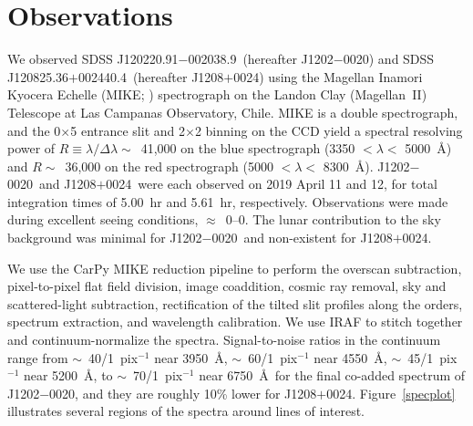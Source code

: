 \documentclass[twocolumn,tighten]{aastex62}
\newcommand{\jtwo}{J1202$-$0020}
\newcommand{\jeight}{J1208$+$0024}
\newcommand{\jtwolong}{SDSS J120220.91$-$002038.9}
\newcommand{\jeightlong}{SDSS J120825.36$+$002440.4}
\begin{document}
\section{Observations}
\label{obs}


We observed  \jtwolong\ (hereafter \jtwo) and
\jeightlong\ (hereafter \jeight)
using the
Magellan Inamori Kyocera Echelle (MIKE; \citealt{bernstein03}) spectrograph
on the Landon Clay (Magellan~II) Telescope at 
Las Campanas Observatory, Chile.
MIKE is a double spectrograph, and
the 0$\times$5 
entrance slit and 2$\times$2 binning on the CCD yield a 
spectral resolving power of 
$R \equiv \lambda/\Delta\lambda \sim$~41,000 on the blue spectrograph
(3350 $< \lambda <$ 5000~\AA) and $R \sim$~36,000 on the red spectrograph
(5000 $< \lambda <$ 8300~\AA).
\jtwo\ and \jeight\ were each observed on 2019 April 11 and 12,
for total integration times of 5.00~hr and 5.61~hr, respectively.
Observations were made during excellent seeing conditions,
$\approx$~0--0.
The lunar contribution to the sky background was minimal for
\jtwo\ and non-existent for \jeight.

We use the CarPy MIKE reduction pipeline
\citep{kelson00,kelson03}
to perform the overscan subtraction, pixel-to-pixel flat field division,
image coaddition, cosmic ray removal, sky and scattered-light subtraction,
rectification of the tilted slit profiles along the orders,
spectrum extraction, and wavelength calibration.
We use IRAF \citep{tody93} to stitch together and
continuum-normalize the spectra.
Signal-to-noise ratios in the continuum range from
$\sim$~40/1~pix$^{-1}$ near 3950~\AA,
$\sim$~60/1~pix$^{-1}$ near 4550~\AA,
$\sim$~45/1~pix$^{-1}$ near 5200~\AA,
to 
$\sim$~70/1~pix$^{-1}$ near 6750~\AA\
for the final co-added spectrum of \jtwo,
and they are roughly 10\% lower for \jeight.
Figure~\ref{specplot} illustrates several regions
of the spectra around lines of interest.
\end{document}
